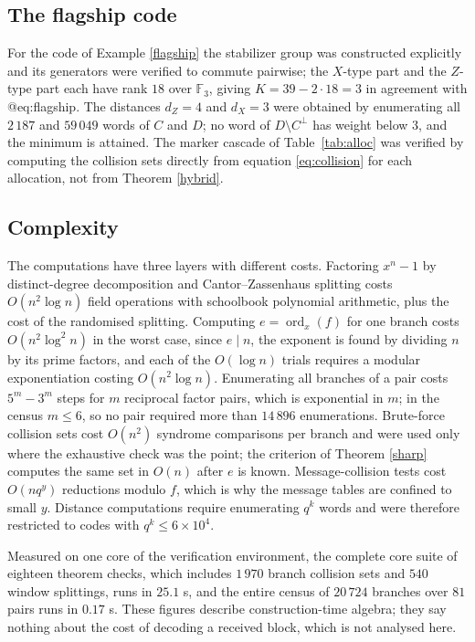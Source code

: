 \documentclass[11pt,reqno]{amsart}
\theoremstyle{definition}
\theoremstyle{remark}
\newcommand{\F}{\mathbb{F}}
\newcommand{\ord}{\operatorname{ord}}
\begin{document}
\subsection{The flagship code}

For the code of Example \ref{flagship} the stabilizer group was constructed explicitly and its generators were verified to commute pairwise; the $X$-type part and the $Z$-type part each have rank $18$ over $\F_3$, giving $K=39-2\cdot18=3$ in agreement with @eq:flagship. The distances $d_Z=4$ and $d_X=3$ were obtained by enumerating all $2\,187$ and $59\,049$ words of $C$ and $D$; no word of $D\setminus C^\perp$ has weight below $3$, and the minimum is attained. The marker cascade of Table~\ref{tab:alloc} was verified by computing the collision sets directly from equation \eqref{eq:collision} for each allocation, not from Theorem \ref{hybrid}.


\subsection{Complexity}

The computations have three layers with different costs. Factoring $x^n-1$ by distinct-degree decomposition and Cantor--Zassenhaus splitting costs $O(n^2\log n)$ field operations with schoolbook polynomial arithmetic, plus the cost of the randomised splitting. Computing $e=\ord_x(f)$ for one branch costs $O(n^2\log^2 n)$ in the worst case, since $e\mid n$, the exponent is found by dividing $n$ by its prime factors, and each of the $O(\log n)$ trials requires a modular exponentiation costing $O(n^2\log n)$. Enumerating all branches of a pair costs $5^m-3^m$ steps for $m$ reciprocal factor pairs, which is exponential in $m$; in the census $m\le6$, so no pair required more than $14\,896$ enumerations. Brute-force collision sets cost $O(n^2)$ syndrome comparisons per branch and were used only where the exhaustive check was the point; the criterion of Theorem \ref{sharp} computes the same set in $O(n)$ after $e$ is known. Message-collision tests cost $O(n q^{y})$ reductions modulo $f$, which is why the message tables are confined to small $y$. Distance computations require enumerating $q^{k}$ words and were therefore restricted to codes with $q^{k}\le6\times10^{4}$.


Measured on one core of the verification environment, the complete core suite of eighteen theorem checks, which includes $1\,970$ branch collision sets and $540$ window splittings, runs in $25.1$ s, and the entire census of $20\,724$ branches over $81$ pairs runs in $0.17$ s. These figures describe construction-time algebra; they say nothing about the cost of decoding a received block, which is not analysed here.
\end{document}
